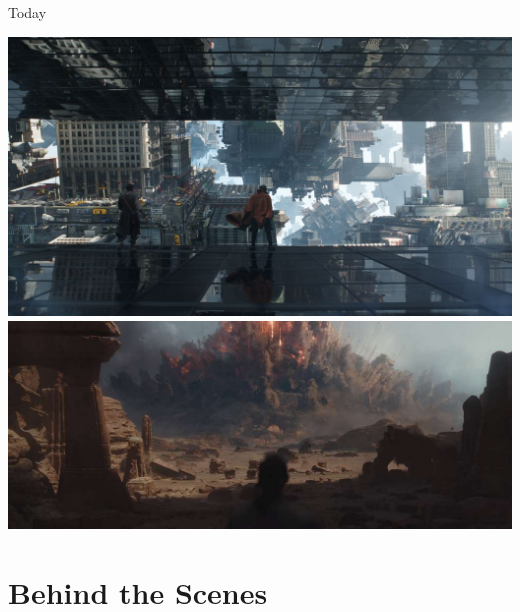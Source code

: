 \documentclass{lug}
\begin{document}
\begin{frame}{Today}
\begin{minipage}{.35\textwidth}
        \includegraphics[width=\textwidth]{graphics/dr_strange} \\
        \includegraphics[width=\textwidth]{graphics/rogue_one_boom}
    \end{minipage}
\end{frame}

\section{Behind the Scenes}
\end{document}

